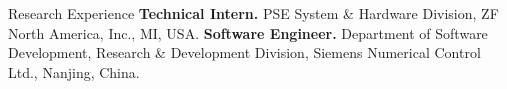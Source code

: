 \begin{rubric}{Research Experience}
\entry*[2021 -- 2021]%
	\textbf{Technical Intern.} PSE System \& Hardware Division, ZF North America, Inc., MI, USA.
%
%
\entry*[2010 -- 2016]%
	\textbf{Software Engineer.} Department of Software Development, Research \& Development Division, Siemens Numerical Control Ltd., Nanjing, China.
%
\end{rubric}